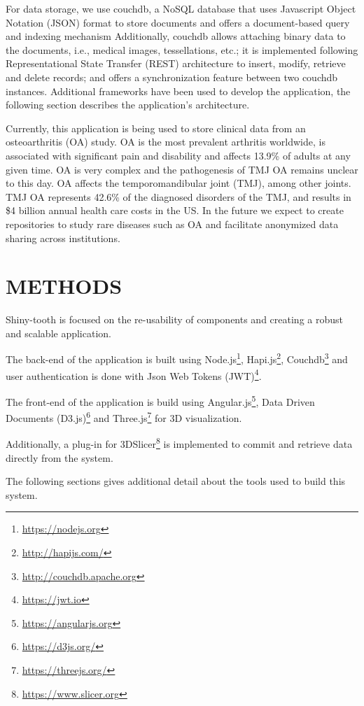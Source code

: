 \documentclass[]{spie}  %
\begin{document}
For data storage, we use couchdb, a NoSQL database that uses Javascript Object Notation 
(JSON) format to store documents 
and offers a document-based query and indexing mechanism
Additionally, couchdb allows attaching binary data to the documents, i.e., medical images, tessellations, etc.; it is implemented following Representational State Transfer (REST) architecture to insert, modify, retrieve and delete records; 
and offers a synchronization feature between two couchdb instances.
Additional frameworks have been used to develop the application, the following section describes 
the application's architecture. 

Currently, this application is being used to store clinical data from an osteoarthritis (OA) study. OA is the most prevalent arthritis worldwide, is associated with significant pain and disability and affects 13.9\% of adults at any given time. OA is very complex and the pathogenesis of TMJ OA remains unclear to this day. OA affects the temporomandibular joint (TMJ), among other joints. TMJ OA represents 42.6\% of the diagnosed disorders of the TMJ, and results in \$4 billion annual health care costs in the US\cite{Cevidanes2010110}\cite{Paniagua2011345}. 
In the future we expect to create repositories to study rare diseases such as OA and facilitate anonymized data sharing
across institutions.

\section{METHODS} 
\label{sec:METHODS}

Shiny-tooth is focused on the re-usability of components and creating a robust and scalable application. 

The back-end of the application is built using Node.js\footnote{\url{https://nodejs.org}},
Hapi.js\footnote{\url{http://hapijs.com/}}, Couchdb\footnote{\url{http://couchdb.apache.org}} and 
user authentication is done with Json Web Tokens (JWT)\footnote{\url{https://jwt.io}}. 

The front-end of the application is build using Angular.js\footnote{\url{https://angularjs.org}}, 
Data Driven Documents (D3.js)\footnote{\url{https://d3js.org/}} and 
Three.js\footnote{\url{https://threejs.org/}} for 3D visualization. 

Additionally, a plug-in for 3DSlicer\footnote{\url{https://www.slicer.org}} 
is implemented to commit and retrieve data directly 
from the system. 

The following sections gives additional detail about the tools used to build this system. 
\end{document}
